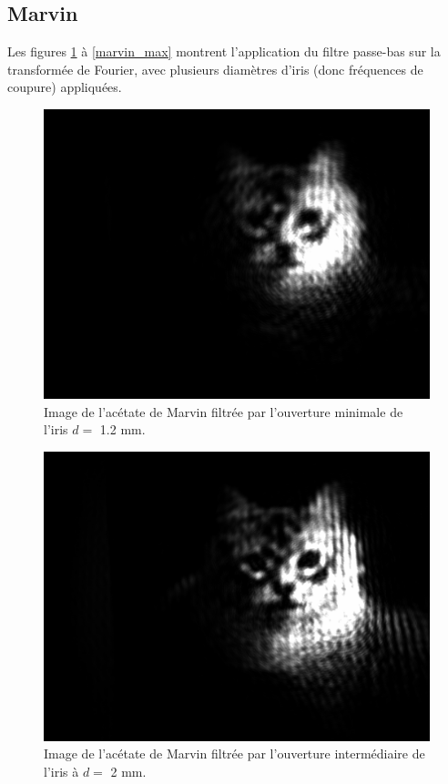 \documentclass[11pt,letterpaper]{article}
\begin{document}
\subsection{Marvin}

Les figures \ref{marvin_min} à \ref{marvin_max} montrent l'application du filtre passe-bas sur la transformée de
Fourier, avec plusieurs diamètres d'iris (donc fréquences de coupure) appliquées.

\begin{figure}[H]
  \centering
  \includegraphics[scale=0.28]{marvin_min.png}
  \caption{Image de l'acétate de Marvin filtrée par l'ouverture minimale de l'iris $d =$ 1.2 mm.}
  \label{marvin_min}
\end{figure}

\begin{figure}[H]
  \centering
  \includegraphics[scale=0.28]{marvin_partiel_d2.png}
  \caption{Image de l'acétate de Marvin filtrée par l'ouverture intermédiaire de l'iris à $d =$ 2 mm.}
  \label{marvin_mid}
\end{figure}
\end{document}
